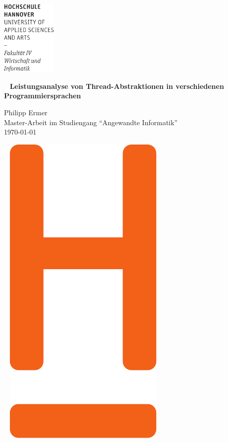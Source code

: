 \documentclass[fontsize=12pt,paper=a4,twoside=semi,parskip=half-,headsepline,headinclude]{scrreprt}
\begin{document}
	\renewcommand{\figurename}{Abb.}
	
  \thispagestyle{empty} %
\includegraphics[width=0.2\textwidth]{hsh_icons/Wortmarke_WI_schwarz}

   {  ~ \sffamily
  \vfill
  {\Huge\bfseries Leistungsanalyse von Thread-Abstraktionen in verschiedenen Programmiersprachen}
  \bigskip

  {\Large 
  Philipp Ermer \\[2ex]
 Master-Arbeit im Studiengang "`Angewandte Informatik"' 
 \\[5ex]
   \today } 
}
 \vfill
  
  ~ \hfill
  \includegraphics[height=0.3\paperheight]{hsh_icons/H_WI_Pantone1665} 

\vspace*{-3cm}
\end{document}
